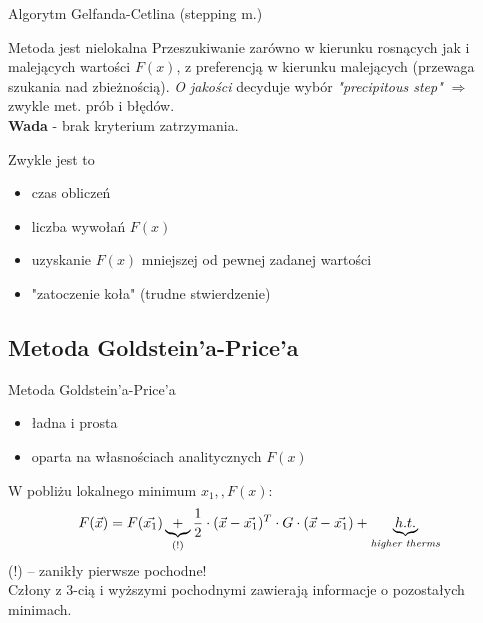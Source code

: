   \begin{frame}{Algorytm Gelfanda-Cetlina (stepping m.)}
    \begin{block}{Metoda jest nielokalna}
      Przeszukiwanie zarówno w kierunku rosnących jak i
      malejących wartości $F(x)$, z preferencją w kierunku
      malejących (przewaga szukania nad zbieżnością).
      \emph{O jakości} decyduje wybór \emph{"precipitous step"}
      $\Rightarrow$ zwykle met. prób i błędów.\\
      \textbf{Wada} - brak kryterium zatrzymania.
    \end{block}

    \begin{block}{Zwykle jest to}
      \begin{itemize}
        \item czas obliczeń
        \item liczba wywołań $F(x)$
        \item uzyskanie $F(x)$ mniejszej od pewnej zadanej
        wartości
        \item "zatoczenie koła" (trudne stwierdzenie)
      \end{itemize}
    \end{block}
  \end{frame}

  \subsection{Metoda Goldstein'a-Price'a}

  \begin{frame}{Metoda Goldstein'a-Price'a}
    \begin{itemize}
      \item ładna i prosta
      \item oparta na własnościach analitycznych $F(x)$
    \end{itemize}
    W pobliżu lokalnego minimum $x_{1}{,}, F(x)$:
    \begin{displaymath}
      F(\vec{x})=F(\vec{x_{1}}) \underbrace{+}_{(!)}
      \frac{1}{2} \cdot (\vec{x} - \vec{x_{1}})^T \cdot
      G \cdot (\vec{x} - \vec{x_{1}}) +
      \underbrace{h.t.}_{\text{\emph{higher therms}}}
    \end{displaymath}
    (!) -- zanikły pierwsze pochodne!\\
    Człony z 3-cią i wyższymi pochodnymi zawierają informacje
    o pozostałych minimach.
  \end{frame}
